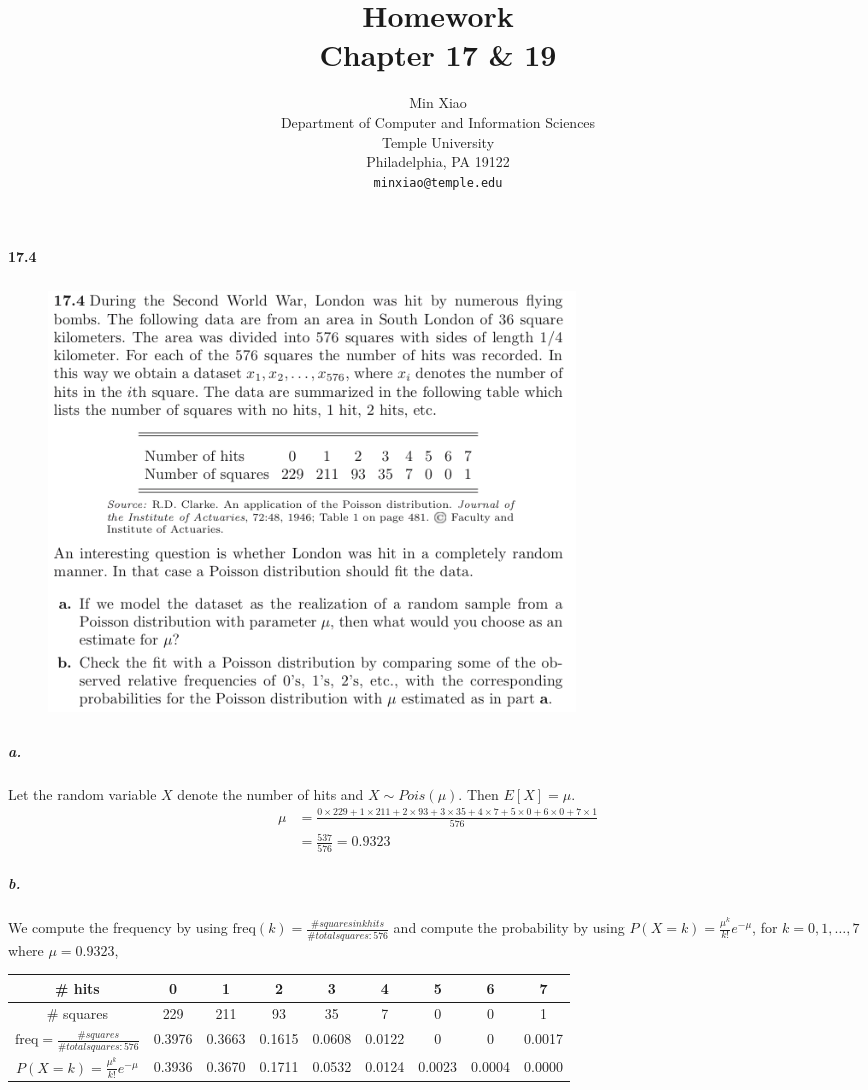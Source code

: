 \documentclass{article} %
\title{Homework \\
Chapter 17 \& 19}
\author{
Min Xiao\\
Department of Computer and Information Sciences\\
Temple University\\
Philadelphia, PA 19122 \\
\texttt{minxiao@temple.edu} \\
}
\begin{document}
\maketitle

\paragraph*{17.4} 
\begin{figure}[h!]
\centering
\includegraphics[width=5.5in, height=4.5in]{1.png}
\end{figure}

\subparagraph*{a.} Let the random variable $X$ denote the number of hits and $X \sim Pois(\mu)$. Then $E[X] = \mu$. 
\begin{align*}
\mu & = \frac{0\times 229 + 1\times 211 + 2\times 93 + 3 \times 35 + 4 \times 7 + 5 \times 0 + 6\times 0 + 7\times 1}{576}\\
& = \frac{537}{576} = 0.9323
\end{align*}

\subparagraph*{b.} 
We compute the frequency by using $\text{freq}(k)=\frac{\#squares in k hits}{\#total squares:576}$ and compute the probability by using $P(X=k) = \frac{\mu^k}{k!}e^{-\mu}$, for $k=0,1, \ldots, 7$ where $\mu =0.9323$, 
\begin{table}[h!]
\centering
\begin{tabular}{ccccccccc} \\ \hline \hline 
\# hits & 0 & 1 & 2 & 3 & 4 & 5 & 6 & 7 \\ \hline
\# squares & 229 & 211 & 93 & 35 & 7 & 0 & 0 & 1 \\ \hline
$\text{freq}=\frac{\#squares}{\#total squares:576}$ &
0.3976 & 0.3663  &   0.1615   &  0.0608  &   0.0122    &     0    &     0  &  0.0017\\
$P(X=k) = \frac{\mu^k}{k!}e^{-\mu}$ & 
 0.3936  &  0.3670  &  0.1711  &  0.0532 &   0.0124  &  0.0023  &  0.0004 &   0.0000 \\
\hline \hline
\end{tabular}
\end{table}
\end{document}
